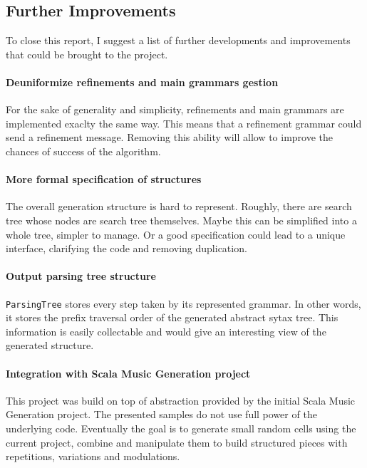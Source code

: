 \documentclass[twocolumn, 11pt]{article}
\newcommand{\code}[1]{\lstinline[language=Scala,columns=fixed,basicstyle=\ttfamily]|#1|}
\begin{document}
\subsection{Further Improvements}

To close this report, I suggest a list of further developments and improvements that could be brought to the project.

\paragraph{Deuniformize refinements and main grammars gestion}

For the sake of generality and simplicity, refinements and main grammars are implemented exaclty the same way. This means that a refinement grammar could send a refinement message. Removing this ability will allow to improve the chances of success of the algorithm.

\paragraph{More formal specification of structures}

The overall generation structure is hard to represent. Roughly, there are search tree whose nodes are search tree themselves. Maybe this can be simplified into a whole tree, simpler to manage. Or a good specification could lead to a unique interface, clarifying the code and removing duplication.

\paragraph{Output parsing tree structure}
\code{ParsingTree} stores every step taken by its represented grammar. In other words, it stores the prefix traversal order of the generated abstract sytax tree.
This information is easily collectable and would give an interesting view of the generated structure.

\paragraph{Integration with Scala Music Generation project}

This project was build on top of abstraction provided by the initial Scala Music Generation project. The presented samples do not use full power of the underlying code. Eventually the goal is to generate small random cells using the current project, combine and manipulate them to build structured pieces with repetitions, variations and modulations.
\end{document}
